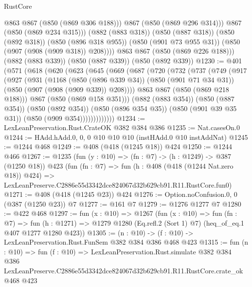 \begin{lexlean}{RustCore}
\begin{coremodule}
                @863
                @867
                (@850 (@869 @306 @188)))
              @867
              (@850 (@869 @296 @314)))
            @867
            (@850 (@869 @234 @315)))
          (@882 (@883 @318))
          (@850 (@887 @318))
          (@850 (@892 @318))
          (@850 (@896 @318 @955))
          (@850 (@901 @73 @955 @31))
          (@850 (@907 (@908 (@909 @318)) @208))))
      @863
      @867
      (@850 (@869 @226 @188)))
    (@882 (@883 @339))
    (@850 (@887 @339))
    (@850 (@892 @339))
@1230 := @401
    (@571
      (@618
        (@620
          (@623
            (@645
              (@669
                (@687
                  (@720
                    (@732
                      (@737
                        (@749
                          (@917
                            (@927
                              (@931
                                (@1168
                                  (@850 (@896 @339 @34))
                                  (@850 (@901 @71 @34 @31))
                                  (@850 (@907 (@908 (@909 @339)) @208))))
                              @863
                              @867
                              (@850 (@869 @218 @188)))
                            @867
                            (@850 (@869 @158 @351)))
                          (@882 (@883 @354))
                          (@850 (@887 @354))
                          (@850 (@892 @354))
                          (@850 (@896 @354 @35))
                          (@850 (@901 @39 @35 @31))
                          (@850 (@909 @354)))))))))))))
@1234 := LexLeanPreservation.Rust.CrateOK @382 @384 @386
@1235 := Nat.casesOn.{0}
@1244 := HAdd.hAdd.{0, 0, 0} @10 @10 @10 (instHAdd.{0} @10 instAddNat)
@1245 := @1244 @468
@1249 := @408 (@418 (@1245 @18)) @424
@1250 := @1244 @466
@1267 := @1235
    (fun (y : @10) => (fn : @7) -> (h : @1249) -> @387 (@1250 @18))
    @423
    (fun (fn : @7) =>
    fun (h : @408 (@418 (@1244 Nat.zero @18)) @424) =>
    LexLeanPreserve.C2886e55d3342dce824067d32b629cb91.R11.RustCore.fun0)
@1271 := @408 (@418 (@1245 @23)) @424
@1276 := Option.noConfusion.{0, 0} (@387 (@1250 @23)) @7
@1277 := @161 @7
@1279 := @1276 @1277 @7
@1280 := @422 @468
@1297 := fun (x : @10) =>
  @1267
    (fun (x : @10) =>
    fun (fn : @7) =>
    fun (h : @1271) => @1279 @1280 (Eq.refl.{2} (Sort 1) @7) (heq_of_eq.{1} @407 @1277 @1280 @423))
@1305 := (n : @10) -> (f : @10) -> LexLeanPreservation.Rust.FunSem @382 @384 @386 @468 @423
@1315 := fun (n : @10) =>
  fun (f : @10) =>
  LexLeanPreservation.Rust.simulate
    @382
    @384
    @386
    LexLeanPreserve.C2886e55d3342dce824067d32b629cb91.R11.RustCore.crate_ok
    @468
    @423
\end{coremodule}
\end{lexlean}
